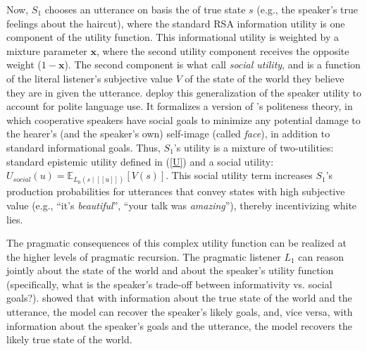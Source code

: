\documentclass{sp}
\newcommand{\mf}[1]{\textcolor{orange}{[mf: #1]}}
\newcommand{\mht}[1]{\textcolor{purple}{[mht: #1]}}
\newcommand{\sem}[1]{\ensuremath{[\![#1]\!]}}
\begin{document}
Now, $S_1$ chooses an utterance on basis the of true state $s$ (e.g., the speaker's true feelings about the haircut), where the standard RSA information utility is one component of the utility function. 
This informational utility is weighted by a mixture parameter $\textbf{x}$, where the second utility component receives the opposite weight ($1-\textbf{x}$).
The second component is what \cite{yoonetal2016} call \emph{social utility}, and is a function of the literal listener's subjective value $V$ of the state of the world they believe they are in given the utterance.
\cite{yoonetal2016} deploy this generalization of the speaker utility to account for polite language use. 
It formalizes a version of \cite{brown1987politeness}'s politeness theory, in which cooperative speakers have social goals to minimize any potential damage to the hearer’s (and the speaker’s own) self-image (called \emph{face}), in addition to standard informational goals. 
Thus, $S_1$'s utility is a mixture of two-utilities: standard epistemic utility defined in (\ref{U}) and a social utility: $U_{social}(u)  =  \mathbb{E}_{L_0(s \mid \sem{u})}[V(s)]$.
%
This social utility term increases $S_1$'s production probabilities for utterances that convey states with high subjective value (e.g., ``it's \emph{beautiful}'', ``your talk was \emph{amazing}''), thereby incentivizing white lies. 

The pragmatic consequences of this complex utility function can be realized at the higher levels of pragmatic recursion.
The pragmatic listener $L_1$ can reason jointly about the state of the world and about the speaker's utility function (specifically, what is the speaker's trade-off between informativity vs. social goals?). \cite{yoonetal2016} showed that with information about the true state of the world and the utterance, the model can recover the speaker's likely goals, and, vice versa, with information about the speaker's goals and the utterance, the model recovers the likely true state of the world.
\end{document}
